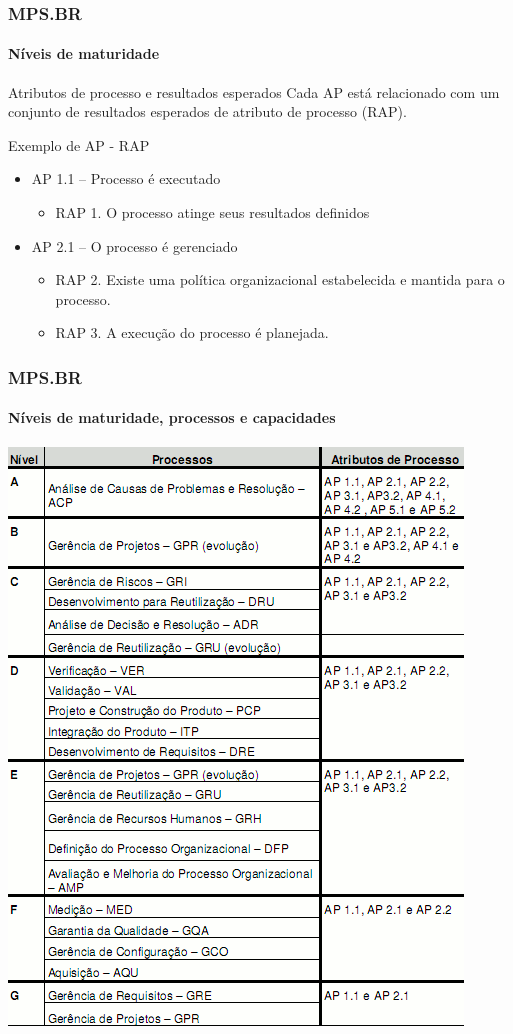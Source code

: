 \begin{frame}
	\frametitle{MPS.BR}
	\framesubtitle{Níveis de maturidade}
	
	\begin{block:fact}{Atributos de processo e resultados esperados}
		Cada AP está relacionado com um conjunto de resultados esperados de atributo de processo (RAP).
	\end{block:fact}
	
	\begin{block:fact}{Exemplo de AP - RAP}
		\begin{itemize}
			\item AP 1.1 -- Processo é executado
			\begin{itemize}
				\item RAP 1. O processo atinge seus resultados definidos
			\end{itemize}
	
			\item AP 2.1 – O processo é gerenciado
			\begin{itemize}
				\item RAP 2. Existe uma política organizacional estabelecida e mantida
				para o processo.
				\item RAP 3. A execução do processo é planejada.
			\end{itemize}
		\end{itemize}
	\end{block:fact}
\end{frame}


\begin{frame}
	\frametitle{MPS.BR}
	\framesubtitle{Níveis de maturidade, processos e capacidades}
	
	\begin{block:fact}{}
		\centering
		\includegraphics[width=.6\textwidth]{software-engineering/project-management/process/process-quality/mpsbr/levels-processes-capacities}
	\end{block:fact}
\end{frame}


